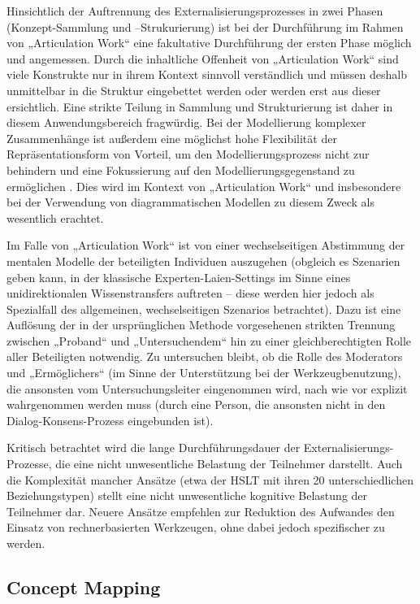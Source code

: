 Hinsichtlich der Auftrennung des Externalisierungsprozesses in zwei Phasen (Konzept-Sammlung und –Strukurierung) ist bei der Durchführung im Rahmen von „Articulation Work“ eine fakultative Durchführung der ersten Phase möglich und angemessen. Durch die inhaltliche Offenheit von „Articulation Work“ sind viele Konstrukte nur in ihrem Kontext sinnvoll verständlich und müssen deshalb unmittelbar in die Struktur eingebettet werden oder werden erst aus dieser ersichtlich. Eine strikte Teilung in Sammlung und Strukturierung ist daher in diesem Anwendungsbereich fragwürdig. Bei der Modellierung komplexer Zusammenhänge ist außerdem eine möglichst hohe Flexibilität der Repräsentationsform von Vorteil, um den Modellierungsprozess nicht zur behindern und eine Fokussierung auf den Modellierungsgegenstand zu ermöglichen \citep[][S. 6]{Goguen93}. Dies wird im Kontext von „Articulation Work“ \citep[][S. 10]{Schmidt00} und insbesondere bei der Verwendung von diagrammatischen Modellen zu diesem Zweck \citep[][S. 23]{Jorgensen04} als wesentlich erachtet. 

Im Falle von „Articulation Work“ ist von einer wechselseitigen Abstimmung der mentalen Modelle der beteiligten Individuen auszugehen (obgleich es Szenarien geben kann, in der klassische Experten-Laien-Settings im Sinne eines unidirektionalen Wissenstransfers auftreten – diese werden hier jedoch als Spezialfall des allgemeinen, wechselseitigen Szenarios betrachtet). Dazu ist eine Auflösung der in der ursprünglichen Methode vorgesehenen strikten Trennung zwischen „Proband“ und „Untersuchendem“ hin zu einer gleichberechtigten Rolle aller Beteiligten notwendig. Zu untersuchen bleibt, ob die Rolle des Moderators und „Ermöglichers“ (im Sinne der Unterstützung bei der Werkzeugbenutzung), die ansonsten vom Untersuchungsleiter eingenommen wird, nach wie vor explizit wahrgenommen werden muss (durch eine Person, die ansonsten nicht in den Dialog-Konsens-Prozess eingebunden ist).

Kritisch betrachtet wird die lange Durchführungsdauer der Externalisierungs-Prozesse, die eine nicht unwesentliche Belastung der Teilnehmer darstellt. Auch die Komplexität mancher Ansätze (etwa der \gls{HSLT} mit ihren 20 unterschiedlichen Beziehungstypen) stellt eine nicht unwesentliche kognitive Belastung der Teilnehmer dar.  Neuere Ansätze empfehlen zur Reduktion des Aufwandes den Einsatz von rechnerbasierten Werkzeugen, ohne dabei jedoch spezifischer zu werden. \citep[][S. 29f]{Ifenthaler06}

\subsection{Concept Mapping} %
\label{sub:concept_mapping}

